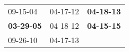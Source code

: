 \begin{supertabular}{p{0.33\columnwidth}p{0.33\columnwidth}p{0.33\columnwidth}}
          09-15-04\textsuperscript{} &  04-17-12\textsuperscript{} &  \textbf{04-18-13\textsuperscript{}} \\
 \textbf{03-29-05\textsuperscript{}} &  04-18-12\textsuperscript{} &  \textbf{04-15-15\textsuperscript{}} \\
          09-26-10\textsuperscript{} &  04-17-13\textsuperscript{} &                                      \\
\end{supertabular}
